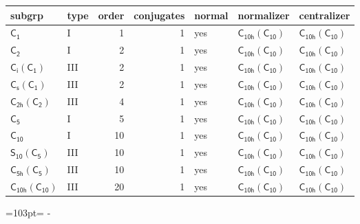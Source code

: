 \documentclass[10pt,a4paper]{article}
\newcommand{\needspace}[1]{\par\penalty-100\begingroup\dimen0=#1\relax\dimen2=\pagegoal
  \advance\dimen2-\pagetotal\ifdim\dimen0>\dimen2\relax\ifdim\dimen2>0pt\vfil\break\fi\fi
  \endgroup}
\numberwithin{equation}{section}
\newcommand{\grp}[1]{\mathsf{#1}}
\begin{document}
{\small\begin{longtable}{@{}llrrlll@{}}\toprule
subgrp & type & order & conjugates & normal & normalizer & centralizer\\\midrule\endhead
\bottomrule\endfoot\endlastfoot
\href{../../../rotation/data/pdf/C1.pdf}{$\grp{C_{1}}$} & I & 1 & 1 & yes & \href{C10h-C10.pdf}{$\grp{C_{10h}}(\grp{C_{10}})$} & \href{C10h-C10.pdf}{$\grp{C_{10h}}(\grp{C_{10}})$}\\*
\href{../../../rotation/data/pdf/C2.pdf}{$\grp{C_{2}}$} & I & 2 & 1 & yes & \href{C10h-C10.pdf}{$\grp{C_{10h}}(\grp{C_{10}})$} & \href{C10h-C10.pdf}{$\grp{C_{10h}}(\grp{C_{10}})$}\\*
\href{S2-C1.pdf}{$\grp{C_{i}}(\grp{C_{1}})$} & III & 2 & 1 & yes & \href{C10h-C10.pdf}{$\grp{C_{10h}}(\grp{C_{10}})$} & \href{C10h-C10.pdf}{$\grp{C_{10h}}(\grp{C_{10}})$}\\*
\href{C1v-C1.pdf}{$\grp{C_{s}}(\grp{C_{1}})$} & III & 2 & 1 & yes & \href{C10h-C10.pdf}{$\grp{C_{10h}}(\grp{C_{10}})$} & \href{C10h-C10.pdf}{$\grp{C_{10h}}(\grp{C_{10}})$}\\*
\href{C2h-C2.pdf}{$\grp{C_{2h}}(\grp{C_{2}})$} & III & 4 & 1 & yes & \href{C10h-C10.pdf}{$\grp{C_{10h}}(\grp{C_{10}})$} & \href{C10h-C10.pdf}{$\grp{C_{10h}}(\grp{C_{10}})$}\\*
\href{../../../rotation/data/pdf/C5.pdf}{$\grp{C_{5}}$} & I & 5 & 1 & yes & \href{C10h-C10.pdf}{$\grp{C_{10h}}(\grp{C_{10}})$} & \href{C10h-C10.pdf}{$\grp{C_{10h}}(\grp{C_{10}})$}\\*
\href{../../../rotation/data/pdf/C10.pdf}{$\grp{C_{10}}$} & I & 10 & 1 & yes & \href{C10h-C10.pdf}{$\grp{C_{10h}}(\grp{C_{10}})$} & \href{C10h-C10.pdf}{$\grp{C_{10h}}(\grp{C_{10}})$}\\*
\href{S10-C5.pdf}{$\grp{S_{10}}(\grp{C_{5}})$} & III & 10 & 1 & yes & \href{C10h-C10.pdf}{$\grp{C_{10h}}(\grp{C_{10}})$} & \href{C10h-C10.pdf}{$\grp{C_{10h}}(\grp{C_{10}})$}\\*
\href{C5h-C5.pdf}{$\grp{C_{5h}}(\grp{C_{5}})$} & III & 10 & 1 & yes & \href{C10h-C10.pdf}{$\grp{C_{10h}}(\grp{C_{10}})$} & \href{C10h-C10.pdf}{$\grp{C_{10h}}(\grp{C_{10}})$}\\*
\href{C10h-C10.pdf}{$\grp{C_{10h}}(\grp{C_{10}})$} & III & 20 & 1 & yes & \href{C10h-C10.pdf}{$\grp{C_{10h}}(\grp{C_{10}})$} & \href{C10h-C10.pdf}{$\grp{C_{10h}}(\grp{C_{10}})$}\\
\bottomrule\end{longtable}}
\needspace{103pt}
\end{document}
